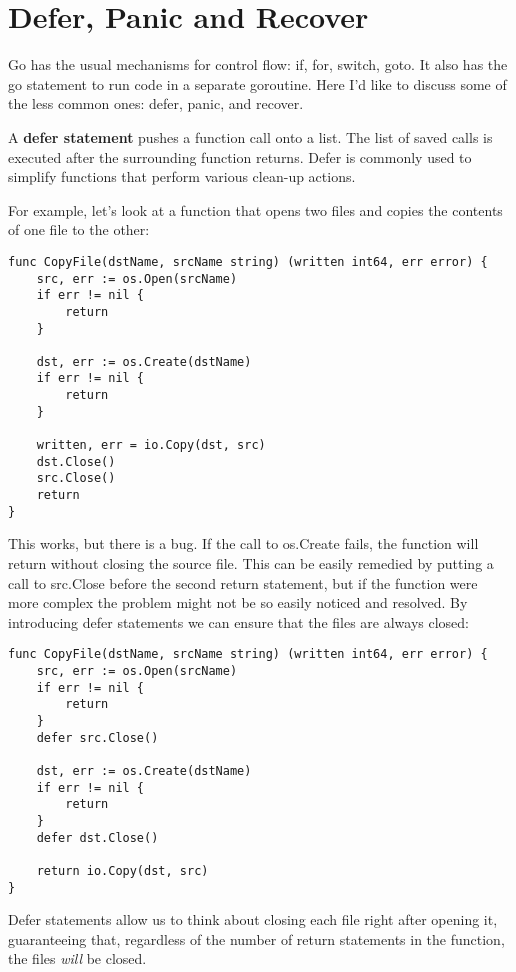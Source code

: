 \cleardoublepage
{}
{}
\chapter*{Defer, Panic and Recover}

Go has the usual mechanisms for control flow: if, for, switch, goto. It
also has the go statement to run code in a separate goroutine. Here I'd
like to discuss some of the less common ones: defer, panic, and recover.

A \textbf{defer statement} pushes a function call onto a list. The list
of saved calls is executed after the surrounding function returns. Defer
is commonly used to simplify functions that perform various clean-up
actions.

For example, let's look at a function that opens two files and copies
the contents of one file to the other:

\begin{Verbatim}[frame=single]
func CopyFile(dstName, srcName string) (written int64, err error) {
    src, err := os.Open(srcName)
    if err != nil {
        return
    }

    dst, err := os.Create(dstName)
    if err != nil {
        return
    }

    written, err = io.Copy(dst, src)
    dst.Close()
    src.Close()
    return
}
\end{Verbatim}

This works, but there is a bug. If the call to os.Create fails, the
function will return without closing the source file. This can be easily
remedied by putting a call to src.Close before the second return
statement, but if the function were more complex the problem might not
be so easily noticed and resolved. By introducing defer statements we
can ensure that the files are always closed:

\begin{Verbatim}[frame=single]
func CopyFile(dstName, srcName string) (written int64, err error) {
    src, err := os.Open(srcName)
    if err != nil {
        return
    }
    defer src.Close()

    dst, err := os.Create(dstName)
    if err != nil {
        return
    }
    defer dst.Close()

    return io.Copy(dst, src)
}
\end{Verbatim}

Defer statements allow us to think about closing each file right after
opening it, guaranteeing that, regardless of the number of return
statements in the function, the files \emph{will} be closed.

